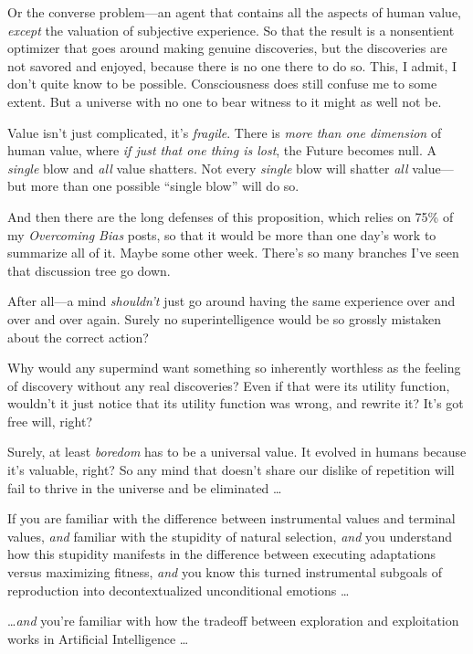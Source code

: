 {
 Or the converse problem---an agent that contains all the aspects
of human value, \textit{except} the valuation of subjective experience.
So that the result is a nonsentient optimizer that goes around making
genuine discoveries, but the discoveries are not savored and enjoyed,
because there is no one there to do so. This, I admit, I
don't quite know to be possible. Consciousness does
still confuse me to some extent. But a universe with no one to bear
witness to it might as well not be.}

{
 Value isn't just complicated, it's
\textit{fragile}. There is \textit{more than one dimension} of human
value, where \textit{if just that one thing is lost}, the Future
becomes null. A \textit{single} blow and \textit{all} value shatters.
Not every \textit{single} blow will shatter \textit{all} value---but
more than one possible ``single
blow'' will do so.}

{
 And then there are the long defenses of this proposition, which
relies on 75\% of my \textit{Overcoming Bias} posts, so that it would
be more than one day's work to summarize all of it.
Maybe some other week. There's so many branches
I've seen that discussion tree go down.}

{
 After all---a mind \textit{shouldn't} just go
around having the same experience over and over and over again. Surely
no superintelligence would be so grossly mistaken about the correct
action?}

{
 Why would any supermind want something so inherently worthless as
the feeling of discovery without any real discoveries? Even if that
were its utility function, wouldn't it just notice that
its utility function was wrong, and rewrite it? It's
got free will, right?}

{
 Surely, at least \textit{boredom} has to be a universal value. It
evolved in humans because it's valuable, right? So any
mind that doesn't share our dislike of repetition will
fail to thrive in the universe and be eliminated \ldots}

{
 If you are familiar with the difference between instrumental
values and terminal values, \textit{and} familiar with the stupidity of
natural selection, \textit{and} you understand how this stupidity
manifests in the difference between executing adaptations versus
maximizing fitness, \textit{and} you know this turned instrumental
subgoals of reproduction into decontextualized unconditional emotions
\ldots}

{
 \ldots \textit{and} you're familiar with how the
tradeoff between exploration and exploitation works in Artificial
Intelligence \ldots}

